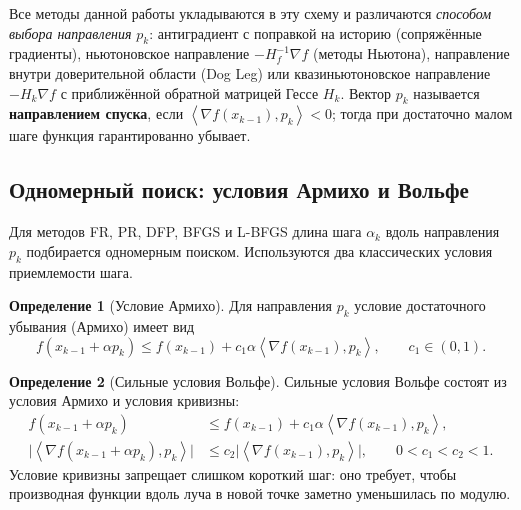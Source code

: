 \documentclass[a4paper,12pt]{article}
\newcommand{\grad}{\nabla}
\newcommand{\inner}[2]{\left\langle #1, #2 \right\rangle}
\theoremstyle{definition}
\newtheorem{definition}{Определение}[section]
\newtheorem{remark}{Замечание}[section]
\begin{document}
Все методы данной работы укладываются в эту схему и различаются \emph{способом выбора направления}
$p_k$: антиградиент с поправкой на историю (сопряжённые градиенты), ньютоновское направление
$-H_f^{-1}\grad f$ (методы Ньютона), направление внутри доверительной области (Dog Leg) или
квазиньютоновское направление $-H_k \grad f$ с приближённой обратной матрицей Гессе $H_k$.
Вектор $p_k$ называется \textbf{направлением спуска}, если $\inner{\grad f(x_{k-1})}{p_k} < 0$;
тогда при достаточно малом шаге функция гарантированно убывает.

\subsection{Одномерный поиск: условия Армихо и Вольфе}

Для методов FR, PR, DFP, BFGS и L-BFGS длина шага $\alpha_k$ вдоль направления $p_k$
подбирается одномерным поиском. Используются два классических условия приемлемости шага.

\begin{definition}[Условие Армихо]
    Для направления $p_k$ условие достаточного убывания (Армихо) имеет вид
    \[
        f(x_{k-1} + \alpha p_k) \leq f(x_{k-1}) + c_1 \alpha \inner{\grad f(x_{k-1})}{p_k},
        \qquad c_1 \in (0,1).
    \]
\end{definition}

\begin{definition}[Сильные условия Вольфе]
    Сильные условия Вольфе состоят из условия Армихо и условия кривизны:
    \begin{align*}
        f(x_{k-1} + \alpha p_k) &\leq f(x_{k-1}) + c_1 \alpha \inner{\grad f(x_{k-1})}{p_k}, \\
        \bigl| \inner{\grad f(x_{k-1} + \alpha p_k)}{p_k} \bigr|
        &\leq c_2 \bigl| \inner{\grad f(x_{k-1})}{p_k} \bigr|,
        \qquad 0 < c_1 < c_2 < 1.
    \end{align*}
    Условие кривизны запрещает слишком короткий шаг: оно требует, чтобы производная функции
    вдоль луча в новой точке заметно уменьшилась по модулю.
\end{definition}

\end{document}
